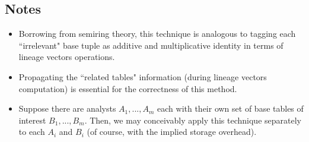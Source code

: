 \subsection{Notes}
\begin{itemize}
    \item Borrowing from semiring theory, this technique is analogous to tagging each ``irrelevant" base tuple as additive and multiplicative identity in terms of lineage vectors operations.
    \item Propagating the ``related tables" information (during lineage vectors computation) is essential for the correctness of this method.
    \item Suppose there are analysts $A_1, ..., A_m$ each with their own set of base tables of interest $B_1, ..., B_m$.
    Then, we may conceivably apply this technique separately to each $A_i$ and $B_i$ (of course, with the implied storage overhead).
\end{itemize}


